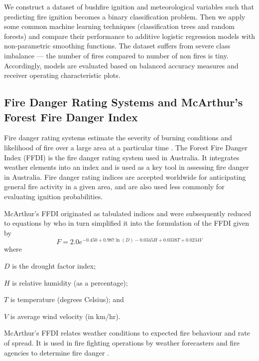 \documentclass[11pt,a4paper]{article}
\begin{document}
We construct a dataset of bushfire ignition and meteorological variables such that predicting fire ignition becomes a binary classification problem. Then we apply some common machine learning techniques (classification trees and random forests) and compare their performance to additive logistic regression models with non-parametric smoothing functions. The dataset suffers from severe class imbalance --- the number of fires compared to number of non fires is tiny. Accordingly, models are evaluated based on balanced accuracy measures and receiver operating characteristic plots.


\subsection{Fire Danger Rating Systems and McArthur's Forest Fire Danger Index}

Fire danger rating systems estimate the severity of burning conditions and likelihood of fire over a large area at a particular time \citep{chandler83, andrews03}. The Forest Fire Danger Index (FFDI) \citep{mcarthur67} is the fire danger rating system used in Australia. It integrates weather elements into an index and is used as a key tool in assessing fire danger in Australia. Fire danger rating indices are accepted worldwide for anticipating general fire activity in a given area, and are also used less commonly for evaluating ignition probabilities.

McArthur's FFDI originated as tabulated indices and were subsequently reduced to equations by \citet{noble80} who in turn simplified it into the formulation of the FFDI given by
\begin{equation}
  \label{eq FFDI}
  F=2.0 e^{-0.450 + 0.987 \ln(D)-0.0345H+0.0338T+0.0234V}
\end{equation}
where
\begin{compactitem}
  \item $D$ is the drought factor index;
  \item $H$ is relative humidity (as a percentage);
  \item $T$ is temperature (degrees Celsius); and
  \item $V$ is average wind velocity (in km/hr).
\end{compactitem}

McArthur's FFDI relates weather conditions to expected fire behaviour and rate of spread. It is used in fire fighting operations by weather forecasters and fire agencies to determine fire danger \citep{clarke2013}.
\end{document}
